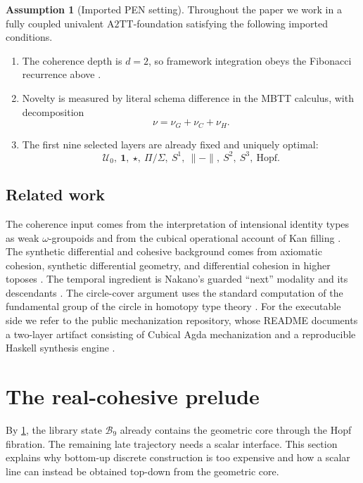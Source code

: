 \documentclass[11pt]{article}
\theoremstyle{plain}
\theoremstyle{definition}
\newtheorem{assumption}[theorem]{Assumption}
\theoremstyle{remark}
\newcommand{\U}{\mathcal{U}}
\newcommand{\B}{\mathcal{B}}
\newcommand{\ATwoTT}{\mathrm{A2TT}}
\begin{document}
\begin{assumption}[Imported PEN setting]
\label{ass:imported-pen}
Throughout the paper we work in a fully coupled univalent $\ATwoTT$-foundation satisfying the following imported conditions.
\begin{enumerate}
    \item The coherence depth is $d=2$, so framework integration obeys the Fibonacci recurrence above \citep{lande-coherence}.
    \item Novelty is measured by literal schema difference in the MBTT calculus, with decomposition
    \[
      \nu = \nu_G+\nu_C+\nu_H.
    \]
    \item The first nine selected layers are already fixed and uniquely optimal:
    \[
      \U_0,\ \mathbf 1,\ \star,\ \Pi/\Sigma,\ S^1,\ \|{-}\|,\ S^2,\ S^3,\ \mathrm{Hopf}.
    \]
\end{enumerate}
\end{assumption}

\subsection{Related work}

The coherence input comes from the interpretation of intensional identity types as weak $\omega$-groupoids and from the cubical operational account of Kan filling \citep{lumsdaine,vdberg-garner,cubical,cchm-hits}. The synthetic differential and cohesive background comes from axiomatic cohesion, synthetic differential geometry, and differential cohesion in higher toposes \citep{lawvere,kock,schreiber}. The temporal ingredient is Nakano's guarded ``next'' modality and its descendants \citep{nakano}. The circle-cover argument uses the standard computation of the fundamental group of the circle in homotopy type theory \citep{licata-shulman}. For the executable side we refer to the public mechanization repository, whose README documents a two-layer artifact consisting of Cubical Agda mechanization and a reproducible Haskell synthesis engine \citep{lande-repo}.

\section{The real-cohesive prelude}

By \cref{ass:imported-pen}, the library state $\B_9$ already contains the geometric core through the Hopf fibration. The remaining late trajectory needs a scalar interface. This section explains why bottom-up discrete construction is too expensive and how a scalar line can instead be obtained top-down from the geometric core.
\end{document}
